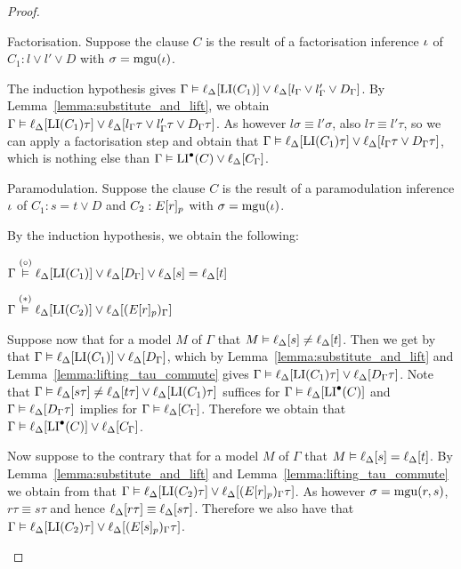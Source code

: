 \documentclass[,%
	draft=false,%
	numbers=noendperiod
	11pt,
	a4paper,
	oneside,%
	openany,
]{memoir}
\begin{document}
\begin{proof}
\begin{description}
		\item{} Factorisation. 
			Suppose the clause $C$ is the result of a factorisation inference $\iota$ of $C_1: l \lor l' \lor D$ with $\sigma=\operatorname{mgu}(\iota)$.
			
			The induction hypothesis gives $\Gamma \vDash \ell_{\Delta}[ \operatorname{LI}(C_1) ] \lor \ell_{\Delta}[ l_\Gamma \lor l'_\Gamma \lor D_\Gamma ]$.
			By Lemma~\ref{lemma:substitute_and_lift}, we obtain
			$\Gamma \vDash \ell_{\Delta}[ \operatorname{LI}(C_1)\tau ] \lor \ell_{\Delta}[ l_\Gamma\tau \lor l'_\Gamma\tau \lor D_\Gamma\tau ]$.
			As however $l\sigma \equiv l'\sigma$, 
			also $l\tau \equiv l'\tau$, so we can apply a factorisation step and obtain that
			$\Gamma \vDash \ell_{\Delta}[ \operatorname{LI}(C_1)\tau ] \lor \ell_{\Delta}[ l_\Gamma\tau \lor D_\Gamma\tau ]$,
			which is nothing else than $\Gamma \vDash \operatorname{LI}^\bullet(C) \lor \ell_{\Delta}[C_\Gamma]$.

		\item{} Paramodulation.
			Suppose the clause $C$ is the result of a paramodulation inference\nolinebreak{} $\iota$ of $C_1: s=t \lor D$ and $C_2: E{[r]_{p}}$ with $\sigma=\operatorname{mgu}(\iota)$.

			By the induction hypothesis, we obtain the following: 

			$\Gamma \stackrel{(\circ)}{\vDash} \ell_{\Delta}[\operatorname{LI}(C_1)] \lor \ell_{\Delta}[D_\Gamma] \lor \ell_{\Delta}[s]=\ell_{\Delta}[t]$

			$\Gamma \stackrel{(*)}{\vDash} \ell_{\Delta}[\operatorname{LI}(C_2)] \lor \ell_{\Delta}[(E{[r]_{p}})_\Gamma]$

			Suppose now that for a model $M$ of $\Gamma$ that $M \vDash \ell_{\Delta}[s]\neq \ell_{\Delta}[t]$.
			Then we get by \markA{} that $\Gamma \vDash \ell_{\Delta}[\operatorname{LI}(C_1)] \lor \ell_{\Delta}[D_\Gamma]$, which by Lemma~\ref{lemma:substitute_and_lift} and Lemma~\ref{lemma:lifting_tau_commute} gives $\Gamma \vDash \ell_{\Delta}[\operatorname{LI}(C_1)\tau] \lor \ell_{\Delta}[D_\Gamma\tau]$.
			Note that $\Gamma \vDash \ell_{\Delta}[s\tau]\neq \ell_{\Delta}[t\tau] \lor \ell_{\Delta}[\operatorname{LI}(C_1)\tau]$ suffices for $\Gamma \vDash \ell_{\Delta}[\operatorname{LI}^\bullet(C)]$ and $\Gamma \vDash \ell_{\Delta}[D_\Gamma\tau]$ implies for $\Gamma \vDash \ell_{\Delta}[C_\Gamma]$.
			Therefore we obtain that 
			$\Gamma \vDash \ell_{\Delta}[\operatorname{LI}^\bullet(C)] \lor \ell_{\Delta}[C_\Gamma]$.

			Now suppose to the contrary that for a model $M$ of $\Gamma$ that $M \vDash \ell_{\Delta}[s]=\ell_{\Delta}[t]$.
			By Lemma~\ref{lemma:substitute_and_lift} and  Lemma~\ref{lemma:lifting_tau_commute} we obtain from \markB{} that
			$\Gamma \vDash \ell_{\Delta}[\operatorname{LI}(C_2)\tau] \lor \ell_{\Delta}[(E{[r]_{p}})_\Gamma\tau]$.
			As however $\sigma = \operatorname{mgu}(r, s)$, $r\tau \equiv s\tau$
			and hence $\ell_{\Delta}[r\tau] \equiv \ell_{\Delta}[s\tau]$.
			Therefore we also have that 
			$\Gamma \vDash \ell_{\Delta}[\operatorname{LI}(C_2)\tau] \lor \ell_{\Delta}[(E{[s]_{p}})_\Gamma\tau]$.


\end{description}
\end{proof}
\end{document}

